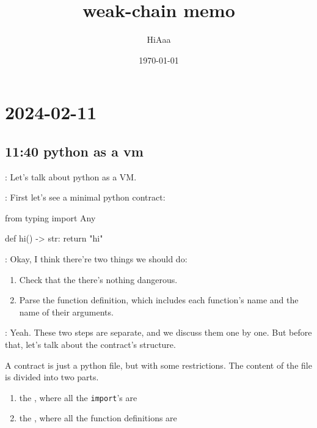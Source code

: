 \documentclass[dvipsnames]{article}
\title{weak-chain memo}
\date{\today}
\author{HiAaa}
\begin{document}
\maketitle
\tableofcontents{}
\newpage{}

% 
% 

\section*{2024-02-11}

\subsection*{11:40 python as a vm}
: Let's talk about python as a VM.

 : First let's see a minimal python contract:

\begin{simplepy}
from typing import Any

def hi() -> str:
    return "hi"

\end{simplepy}

 : Okay, I think there're two things we should do:

\begin{enumerate}
\item Check that the there's nothing dangerous.
\item Parse the function definition, which includes each function's name and the
  name of their arguments.
\end{enumerate}

: Yeah. These two steps are separate, and we discuss them one by one. But before that,
let's talk about the contract's structure.

A contract is just a python file, but with some restrictions. The content of the
file is divided into two parts.

\begin{enumerate}
\item the , where all the \texttt{import}'s are
\item the , where all the function definitions are
\end{enumerate}
\end{document}
